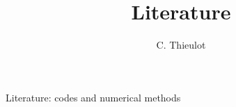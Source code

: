 \documentclass[a4paper,12pt]{article}
\title{Literature}
\author{C. Thieulot}
\begin{document}
\thispagestyle{empty}

\begin{center}
{\large Literature: codes and numerical methods}
\end{center}

\tableofcontents





\printbibliography
\end{document}
